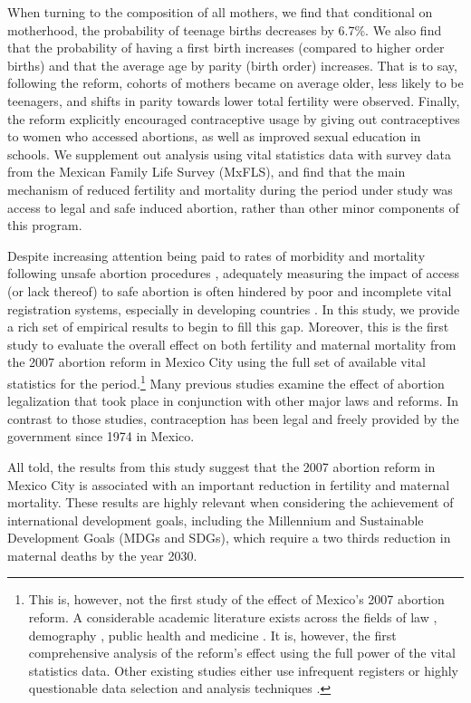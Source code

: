 \documentclass[a4paper, 11pt]{article}
\begin{document}
\begin{spacing}{2}
When turning to the composition of all mothers, we find that conditional on motherhood, the probability of teenage births decreases by 6.7\%. We also find that the probability of having a first birth increases (compared to higher order births) and that the average age by parity (birth order) increases.  That is to say, following the reform, cohorts of mothers became on average older, less likely to be teenagers, and shifts in parity towards lower total fertility were observed.  Finally, the reform explicitly encouraged contraceptive usage by giving out contraceptives to women who accessed abortions, as well as improved sexual education in schools. We supplement out analysis using vital statistics data with survey data from the Mexican Family Life Survey (MxFLS), and find that the main mechanism of reduced fertility and mortality during the period under study was access to legal and safe induced abortion, rather than other minor components of this program.   

Despite increasing attention being paid to rates of morbidity and mortality following unsafe abortion procedures \citep{Grimes2006,Brown2007,Kulczycki2011}, adequately measuring the impact of access (or lack thereof) to safe abortion is often hindered by poor and incomplete vital registration systems, especially in developing countries \citep{Grimes2006}.  In this study, we provide a rich set of empirical results to begin to fill this gap.  Moreover, this is the first study to evaluate the overall effect on both fertility and maternal mortality from the 2007 abortion reform in Mexico City using the full set of available vital statistics for the period.\footnote{This is, however, not the first study of the effect of Mexico's 2007 abortion reform.  A considerable academic literature exists across the fields of law \citep{Johnson2013}, demography \citep{Contreras2011}, public health \citep{Schiavonetal2010,Becker2013,Kalb} and medicine \citep{Madrazo2009}.  It is, however, the first comprehensive analysis of the reform's effect using the full power of the vital statistics data.  Other existing studies either use infrequent registers \citep{Gutierrez2015} or highly questionable data selection and analysis techniques \citep{Koch01022015}.}  Many previous studies examine the effect of abortion legalization that took place in conjunction with other major laws and reforms. In contrast to those studies, contraception has been legal and freely provided by the government since 1974 in Mexico.

All told, the results from this study suggest that the 2007 abortion reform in Mexico City is associated with an important reduction in fertility and maternal mortality. These results are highly relevant when considering the achievement of international development goals, including the Millennium and Sustainable Development Goals (MDGs and SDGs), which require a two thirds reduction in maternal deaths by the year 2030.



\end{spacing}
\end{document}
